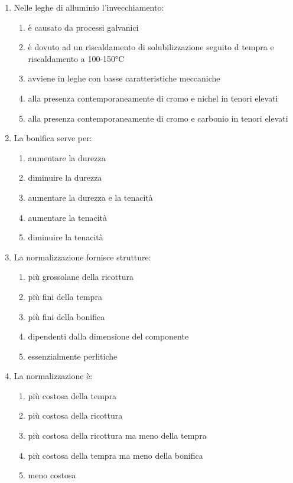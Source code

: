 \begin{enumerate}
    \item Nelle leghe di alluminio l’invecchiamento:
    \begin{enumerate}
        \item è causato da processi galvanici
        \item è dovuto ad un riscaldamento di solubilizzazione seguito d tempra e riscaldamento a 100-150°C
        \item avviene in leghe con basse caratteristiche meccaniche
        \item alla presenza contemporaneamente di cromo e nichel in tenori elevati
        \item alla presenza contemporaneamente di cromo e carbonio in tenori elevati
    \end{enumerate}
    \item La bonifica serve per:
    \begin{enumerate}
        \item aumentare la durezza
        \item diminuire la durezza
        \item aumentare la durezza e la tenacità
        \item aumentare la tenacità
        \item diminuire la tenacità
    \end{enumerate}
    \item La normalizzazione fornisce strutture:
    \begin{enumerate}
        \item più grossolane della ricottura
        \item più fini della tempra
        \item più fini della bonifica
        \item dipendenti dalla dimensione del componente
        \item essenzialmente perlitiche
    \end{enumerate}
    \item La normalizzazione è:
    \begin{enumerate}
        \item più costosa della tempra
        \item più costosa della ricottura
        \item più costosa della ricottura ma meno della tempra
        \item più costosa della tempra ma meno della bonifica
        \item meno costosa
    \end{enumerate}

\end{enumerate}
